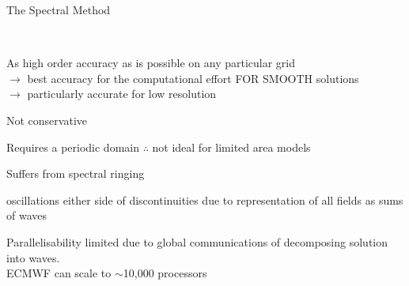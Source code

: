 \begin{slide}{The Spectral Method}

\ \\
\begin{list0}

\item As high order accuracy as is possible on any particular grid\\
$\rightarrow$ best accuracy for the computational effort FOR SMOOTH solutions\\
$\rightarrow$ particularly accurate for low resolution

\item Not conservative

\item Requires a periodic domain $\therefore$ not ideal for limited area models

\item Suffers from spectral ringing
\begin{list1}
    \item oscillations either side of discontinuities due to representation of all fields as sums of waves
\end{list1}
\item Parallelisability limited due to global communications of decomposing solution into waves.\\
ECMWF can scale to $\sim$10,000 processors
\end{list0}

\end{slide}

